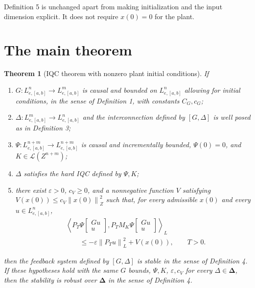 \documentclass[10pt,twocolumn,letterpaper]{article}
\newtheorem{theorem}{Theorem}
\theoremstyle{definition}
\theoremstyle{plain}
\newcommand{\col}[1]{\begin{bmatrix}#1\end{bmatrix}}
\newcommand{\ip}[2]{\left\langle #1,#2\right\rangle}
\newcommand{\norm}[1]{\left\lVert #1\right\rVert}
\begin{document}
Definition 5 is unchanged apart from making initialization and the
input dimension explicit. It does not require $x(0)=0$ for the plant.

\section*{The main theorem}

\begin{theorem}[IQC theorem with nonzero plant initial conditions]
If
\begin{enumerate}
\item $G:L^n_{e,[a,b]}\to L^m_{e,[a,b]}$ is causal and bounded on
$L^n_{e,[a,b]}$ allowing for initial conditions, in the sense of
Definition 1, with constants $C_G,c_G$;
\item $\Delta:L^m_{e,[a,b]}\to L^n_{e,[a,b]}$ and the interconnection
defined by $[G,\Delta]$ is well posed as in Definition 3;
\item $\Psi:L^{n+m}_{e,[a,b]}\to L^{n+m}_{e,[a,b]}$ is causal and
incrementally bounded, $\Psi(0)=0$, and $K\in\mathcal L(Z^{n+m})$;
\item $\Delta$ satisfies the hard IQC defined by $\Psi,K$;
\item there exist $\varepsilon>0$, $c_V\geq0$, and a nonnegative
function $V$ satisfying $V(x(0))\leq c_V\norm{x(0)}_Z^2$ such that,
for every admissible $x(0)$ and every $u\in L^n_{e,[a,b]}$,
\begin{equation}\label{eq:three}
\begin{aligned}
 &\ip{P_T\Psi\col{Gu\\u}}{
          P_TM_K\Psi\col{Gu\\u}}_L\\
 &\qquad\leq
 -\varepsilon\norm{P_Tu}_L^2+V(x(0)),
 \qquad T>0.
\end{aligned}
\end{equation}
\end{enumerate}
then the feedback system defined by $[G,\Delta]$ is stable in the sense
of Definition 4.
If these hypotheses hold with the same $G$ bounds, $\Psi,K$,
$\varepsilon,c_V$ for every $\Delta\in\boldsymbol\Delta$, then the
stability is robust over $\boldsymbol\Delta$ in the sense of Definition 4.
\end{theorem}
\end{document}
